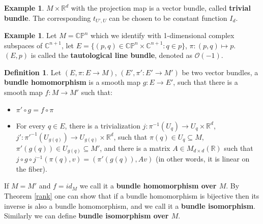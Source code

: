 \documentclass{article}
\theoremstyle{definition}
\newtheorem{dfn}[thm]{Definition}
\newtheorem{exm}[thm]{Example}
\begin{document}
\begin{exm}
    $M\times\mathbb{R}^d$ with the projection map is a vector bundle, called {\bf trivial bundle}. The corresponding $t_{U', U}$ can be chosen to be constant function $I_d$.
\end{exm}

\begin{exm}
    Let $M=\mathbb{CP}^n$ which we identify with 1-dimensional complex subspaces of $\mathbb{C}^{n+1}$, let $E=\{(p, q)\in \mathbb{CP}^n\times\mathbb{C}^{n+1}: q\in p\}$, $\pi: (p, q)\mapsto p$. $(E, p)$ is called the {\bf tautological line bundle}, denoted as $\mathcal{O}(-1)$.
\end{exm}


\begin{dfn}
    Let $(E, \pi: E\rightarrow M)$, $(E', \pi': E'\rightarrow M')$ be two vector bundles, a {\bf bundle homomorphism} is a smooth map $g: E\rightarrow E'$, such that there is a smooth map $f: M\rightarrow M'$ such that:
    \begin{itemize}
    \item $\pi'\circ g=f\circ \pi$
    \item For every $q\in E$, there is a trivialization $j: \pi^{-1}(U_q)\rightarrow U_q\times\mathbb{R}^d$, $j': \pi'^{-1}(U_{g(q)})\rightarrow U_{g(q)}\times\mathbb{R}^d$, such that $\pi(q)\in U_q\subseteq M$, $\pi'(g(q))\in U_{g(q)}\subseteq M'$, and there is a matrix $A\in M_{d\times d}(\mathbb{R})$ such that $j\circ g\circ j^{-1}(\pi(q), v)=(\pi'(g(q)), Av)$ (in other words, it is linear on the fiber).
    \end{itemize}
    If $M=M'$ and $f=id_M$ we call it a {\bf bundle homomorphism over $M$}. By Theorem \ref{rank} one can show that if a bundle homomorphism is bijective then its inverse is also a bundle homomorphism, and we call it a {\bf bundle isomorphism}. Similarly we can define {\bf bundle isomorphism over $M$}.
\end{dfn}
\end{document}
